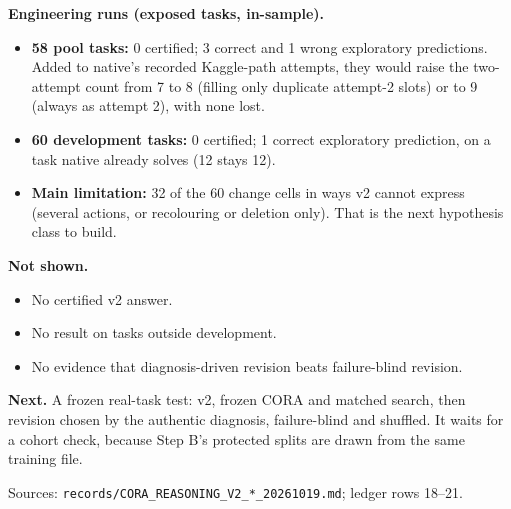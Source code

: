 \documentclass[10pt]{article}
\begin{document}
\textbf{Engineering runs (exposed tasks, in-sample).} \begin{itemize}
  \item \textbf{58 pool tasks:} 0 certified; 3 correct and 1 wrong exploratory predictions. Added to native's recorded
        Kaggle-path attempts, they would raise the two-attempt count from 7 to 8 (filling only duplicate attempt-2 slots)
        or to 9 (always as attempt 2), with none lost.
  \item \textbf{60 development tasks:} 0 certified; 1 correct exploratory prediction, on a task native already solves
        (12 stays 12).
  \item \textbf{Main limitation:} 32 of the 60 change cells in ways v2 cannot express (several actions, or recolouring
        or deletion only). That is the next hypothesis class to build.
\end{itemize}

\textbf{{\color{critical}Not shown.}}
\begin{itemize}
  \item No certified v2 answer.
  \item No result on tasks outside development.
  \item No evidence that diagnosis-driven revision beats failure-blind revision.
\end{itemize}

\textbf{Next.} A frozen real-task test: v2, frozen CORA and matched search, then revision chosen by the authentic
diagnosis, failure-blind and shuffled. It waits for a cohort check, because Step B's protected splits are drawn from
the same training file.

{\color{ink2}\small Sources: \texttt{records/CORA\_REASONING\_V2\_*\_20261019.md}; ledger rows 18--21.\par}
\end{document}
